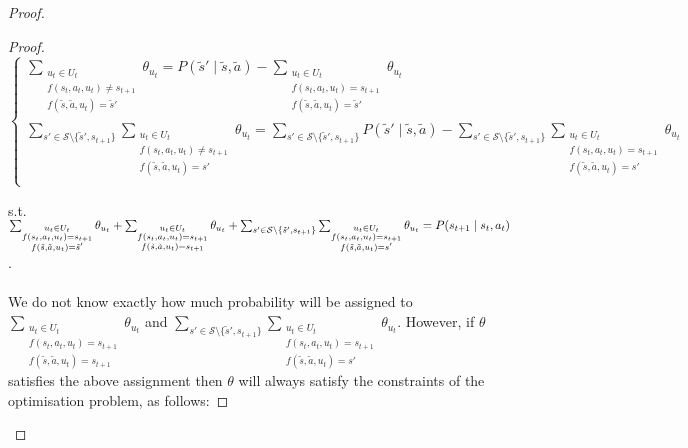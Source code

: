 \begin{proof}
\begin{proof}
\[\begin{cases}
        \sum_{\substack{u_t \in U_t \\f(s_t, a_t, u_t) \neq s_{t+1} \\ f(\tilde{s}, \tilde{a}, u_t) = \tilde{s}'}}{\theta_{u_t}} = P(\tilde{s}' \mid \tilde{s}, \tilde{a}) - \sum_{\substack{u_t \in U_t \\f(s_t, a_t, u_t) = s_{t+1} \\ f(\tilde{s}, \tilde{a}, u_t) = \tilde{s}'}}{\theta_{u_t}} \\
        
        \sum_{s' \in \mathcal{S}\setminus\{\tilde{s}', s_{t+1}\}}\sum_{\substack{u_t \in U_t \\f(s_t, a_t, u_t) \neq s_{t+1} \\ f(\tilde{s}, \tilde{a}, u_t) = s'}}{\theta_{u_t}} = \sum_{s' \in \mathcal{S}\setminus\{\tilde{s}', s_{t+1}\}}P(\tilde{s}' \mid \tilde{s}, \tilde{a}) - \sum_{s' \in \mathcal{S}\setminus\{\tilde{s}', s_{t+1}\}}\sum_{\substack{u_t \in U_t \\f(s_t, a_t, u_t) = s_{t+1} \\ f(\tilde{s}, \tilde{a}, u_t) = s'}}{\theta_{u_t}}\\
    \end{cases}
\]

s.t. $\sum_{\substack{u_t \in U_t \\f(s_t, a_t, u_t) = s_{t+1} \\ f(\tilde{s}, \tilde{a}, u_t) = \tilde{s}'}}{\theta_{u_t}} + \sum_{\substack{u_t \in U_t \\f(s_t, a_t, u_t) = s_{t+1} \\ f(\tilde{s}, \tilde{a}, u_t) = s_{t+1}}}{\theta_{u_t}} + \sum_{s' \in \mathcal{S}\setminus\{\tilde{s}', s_{t+1}\}}\sum_{\substack{u_t \in U_t \\f(s_t, a_t, u_t) = s_{t+1} \\ f(\tilde{s}, \tilde{a}, u_t) = s'}}{\theta_{u_t}} \\= P(s_{t+1} \mid s_t, a_t)$.\\\\

We do not know exactly how much probability will be assigned to $\sum_{\substack{u_t \in U_t \\f(s_t, a_t, u_t) = s_{t+1} \\ f(\tilde{s}, \tilde{a}, u_t) = s_{t+1}}}{\theta_{u_t}}$ and $\sum_{s' \in \mathcal{S} \setminus \{\tilde{s}', s_{t+1}\}}\sum_{\substack{u_t \in U_t \\f(s_t, a_t, u_t) = s_{t+1} \\ f(\tilde{s}, \tilde{a}, u_t)= s'}}{\theta_{u_t}}$. However, if $\theta$ satisfies the above assignment then $\theta$ will always satisfy the constraints of the optimisation problem, as follows:


\end{proof}
\end{proof}
